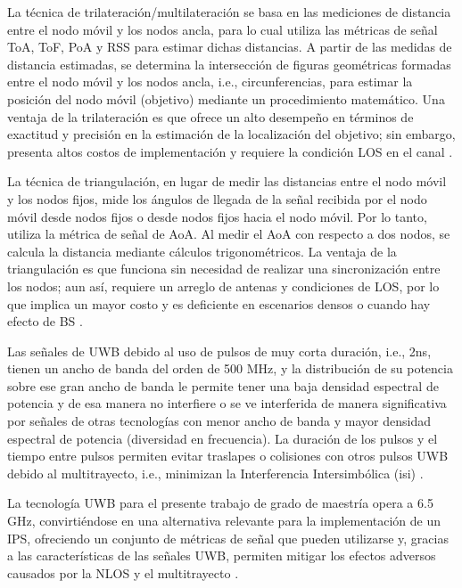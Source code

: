 La técnica de trilateración/multilateración se basa en las mediciones de distancia entre el nodo móvil y los nodos ancla, para lo cual utiliza las métricas de señal ToA, ToF, PoA y RSS para estimar dichas distancias. A partir de las medidas de distancia estimadas, se determina la intersección de figuras geométricas formadas entre el nodo móvil y los nodos ancla, i.e., circunferencias, para estimar la posición del nodo móvil (objetivo) mediante un procedimiento matemático. Una ventaja de la trilateración es que ofrece un alto desempeño en términos de exactitud y precisión en la estimación de la localización del objetivo; sin embargo, presenta altos costos de implementación y requiere la condición LOS en el canal \cite{ref6}.

La técnica de triangulación, en lugar de medir las distancias entre el nodo móvil y los nodos fijos, mide los ángulos de llegada de la señal recibida por el nodo móvil desde nodos fijos o desde nodos fijos hacia el nodo móvil. Por lo tanto, utiliza la métrica de señal de AoA. Al medir el AoA con respecto a dos nodos, se calcula la distancia mediante cálculos trigonométricos. La ventaja de la triangulación es que funciona sin necesidad de realizar una sincronización entre los nodos; aun así, requiere un arreglo de antenas y condiciones de LOS, por lo que implica un mayor costo y es deficiente en escenarios densos o cuando hay efecto de BS \cite{ref6}.

Las señales de UWB debido al uso de pulsos de muy corta duración, i.e., 2ns, tienen un ancho de banda del orden de 500 MHz, y la distribución de su potencia sobre ese gran ancho de banda le permite tener una baja densidad espectral de potencia y de esa manera no interfiere o se ve interferida de manera significativa por señales de otras tecnologías con menor ancho de banda y mayor densidad espectral de potencia (diversidad en frecuencia). La duración de los pulsos y el tiempo entre pulsos permiten evitar traslapes o colisiones con otros pulsos UWB debido al multitrayecto, i.e., minimizan la Interferencia Intersimbólica (\gls{isi}) \cite{ref8}.

La tecnología UWB para el presente trabajo de grado de maestría opera a 6.5 GHz, convirtiéndose en una alternativa relevante para la implementación de un IPS, ofreciendo un conjunto de métricas de señal que pueden utilizarse y, gracias a las características de las señales UWB, permiten mitigar los efectos adversos causados por la NLOS y el multitrayecto \cite{ref8, ref9, ref10, ref11, ref12}. 


